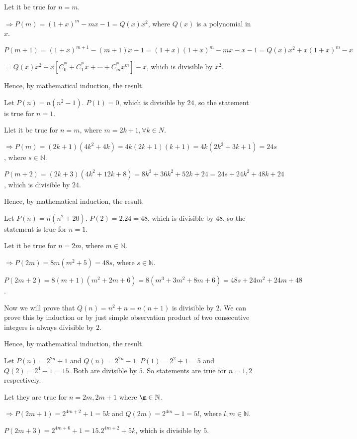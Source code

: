   Let it be true for $n = m$.

  $\Rightarrow P(m) = (1 + x)^m - mx - 1 = Q(x)x^2$, where $Q(x)$ is a polynomial in $x$.

  $P(m + 1) = (1 + x)^{m + 1} - (m + 1)x - 1 = (1 + x)(1 + x)^m - mx - x - 1 = Q(x)x^2 + x(1 + x)^m - x$

  $= Q(x)x^2 + x[C_0^^m + C_1^^mx + \cdots + C_m^^mx^m] - x$, which is divisible by $x^2$.

  Hence, by mathematical induction, the result.
\item Let $P(n) = n(n^2 - 1)$. $P(1) = 0$, which is divisible by $24$, so the statement is true for $n = 1$.

  Llet it be true for $n = m$, where $m = 2k + 1, \forall k\in{N}$.

  $\Rightarrow P(m) = (2k + 1)(4k^2 + 4k) = 4k(2k + 1)(k + 1) = 4k(2k^2 + 3k + 1) = 24s$, where
  $s\in\mathbb{N}$.

  $P(m + 2) = (2k + 3)(4k^2 + 12k + 8) = 8k^3 + 36k^2 + 52k + 24 = 24s + 24k^2 + 48k + 24$, which is
  divisible by $24$.

  Hence, by mathematical induction, the result.
\item Let $P(n) = n(n^2 + 20)$. $P(2) = 2.24 = 48$, which is divisible by $48$, so the statement is true for
  $n = 1$.

  Let it be true for $n = 2m$, where $m\in\mathbb{N}$.

  $\Rightarrow P(2m) = 8m(m^2 + 5) = 48s$, where $s\in\mathbb{N}$.

  $P(2m + 2) = 8(m + 1)(m^2 + 2m + 6) = 8(m^3 + 3m^2 + 8m + 6) = 48s + 24m^2 + 24m + 48$.

  Now we will prove that $Q(n) = n^2 + n = n(n + 1)$ is divisible by $2$. We can prove this by induction or
  by just simple observation product of two consecutive integers is  always divisible by $2$.

  Hence, by mathematical induction, the result.
\item Let $P(n) = 2^{2n} + 1$ and $Q(n) = 2^{2n} - 1$. $P(1) = 2^2 + 1 = 5$ and $Q(2) = 2^4 - 1 = 15$. Both
  are divisible by $5$. So statements are true for $n = 1, 2$ respectively.

  Let they are true for $n = 2m, 2m + 1$ where $\m\in\mathbb{N}$.

  $\Rightarrow P(2m + 1) = 2^{4m + 2} + 1 = 5k$ and $Q(2m) = 2^{4m} - 1 = 5l$, where $l, m\in\mathbb{N}$.

  $P(2m + 3) = 2^{4m + 6} + 1 = 15.2^{4m + 2} + 5k$, which is divisible by $5$.

